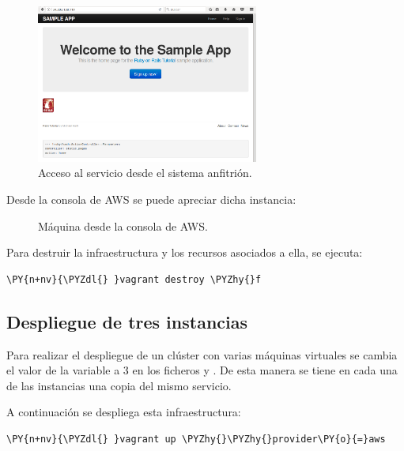 \begin{figure}[H]
\centering
\includegraphics[width=0.65\textwidth]{images/figures/access-aws-1.png}
\caption{Acceso al servicio desde el sistema anfitrión.}
\end{figure}

Desde la consola de AWS se puede apreciar dicha instancia:

\begin{figure}[H]
\caption{Máquina  desde la consola de AWS.}
\end{figure}

Para destruir la infraestructura y los recursos asociados a ella, se ejecuta:

\begin{framed_shaded}
\begin{Verbatim}[fontsize=\relsize{-2.5},fontseries=b,commandchars=\\\{\}]
\PY{n+nv}{\PYZdl{} }vagrant destroy \PYZhy{}f
\end{Verbatim}
\end{framed_shaded}

\subsection{Despliegue de tres instancias}

Para realizar el despliegue de un clúster con varias máquinas virtuales se cambia el valor de la variable  a 3 en los ficheros  y . De esta manera se tiene en cada una de las instancias una copia del mismo servicio.

A continuación se despliega esta infraestructura:

\begin{framed_shaded}
\begin{Verbatim}[fontsize=\relsize{-2.5},fontseries=b,commandchars=\\\{\}]
\PY{n+nv}{\PYZdl{} }vagrant up \PYZhy{}\PYZhy{}provider\PY{o}{=}aws
\end{Verbatim}
\end{framed_shaded}

